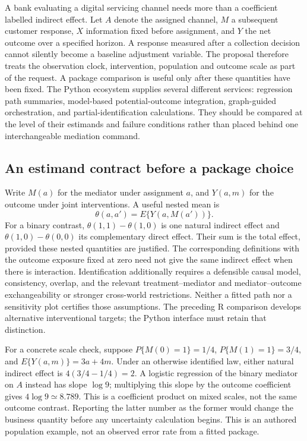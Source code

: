 A bank evaluating a digital servicing channel needs more than a coefficient labelled indirect effect. Let $A$ denote the assigned channel, $M$ a subsequent customer response, $X$ information fixed before assignment, and $Y$ the net outcome over a specified horizon. A response measured after a collection decision cannot silently become a baseline adjustment variable. The proposal therefore treats the observation clock, intervention, population and outcome scale as part of the request. A package comparison is useful only after these quantities have been fixed. The Python ecosystem supplies several different services: regression path summaries, model-based potential-outcome integration, graph-guided orchestration, and partial-identification calculations. They should be compared at the level of their estimands and failure conditions rather than placed behind one interchangeable mediation command. \citep{exec25_pymed_statsmodels,exec25_pymed_pingouin,exec25_pymed_dowhy,exec25_pymed_process,exec25_pymed_choice}

\subsection{An estimand contract before a package choice}
Write $M(a)$ for the mediator under assignment $a$, and $Y(a,m)$ for the outcome under joint interventions. A useful nested mean is
\[
 \theta(a,a')=E\{Y(a,M(a'))\}.
\]
For a binary contrast, $\theta(1,1)-\theta(1,0)$ is one natural indirect effect and $\theta(1,0)-\theta(0,0)$ its complementary direct effect. Their sum is the total effect, provided these nested quantities are justified. The corresponding definitions with the outcome exposure fixed at zero need not give the same indirect effect when there is interaction. Identification additionally requires a defensible causal model, consistency, overlap, and the relevant treatment--mediator and mediator--outcome exchangeability or stronger cross-world restrictions. Neither a fitted path nor a sensitivity plot certifies those assumptions. The preceding R comparison develops alternative interventional targets; the Python interface must retain that distinction. \citep{exec25_pymed_choice,exec25_pymed_sharp_paper}

For a concrete scale check, suppose $P\{M(0)=1\}=1/4$, $P\{M(1)=1\}=3/4$, and $E\{Y(a,m)\}=3a+4m$. Under an otherwise identified law, either natural indirect effect is $4(3/4-1/4)=2$. A logistic regression of the binary mediator on $A$ instead has slope $\log 9$; multiplying this slope by the outcome coefficient gives $4\log9\simeq8.789$. This is a coefficient product on mixed scales, not the same outcome contrast. Reporting the latter number as the former would change the business quantity before any uncertainty calculation begins. This is an authored population example, not an observed error rate from a fitted package. \citep{exec25_pymed_choice}

